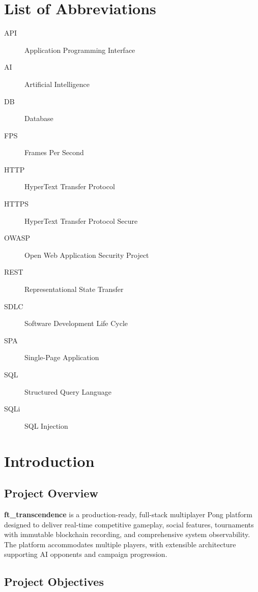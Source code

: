 \documentclass[11pt,a4paper]{report}
\begin{document}
\chapter*{List of Abbreviations}
\label{ch:abbr}
\begin{description}
  \item[API] Application Programming Interface
  \item[AI] Artificial Intelligence
  \item[DB] Database
  \item[FPS] Frames Per Second
  \item[HTTP] HyperText Transfer Protocol
  \item[HTTPS] HyperText Transfer Protocol Secure
  \item[OWASP] Open Web Application Security Project
  \item[REST] Representational State Transfer
  \item[SDLC] Software Development Life Cycle
  \item[SPA] Single-Page Application
  \item[SQL] Structured Query Language
  \item[SQLi] SQL Injection
\end{description}
\clearpage


\chapter{Introduction}
\label{ch:intro}

\section{Project Overview}
\label{sec:overview}

\textbf{ft\_transcendence} is a production-ready, full-stack multiplayer Pong platform designed to deliver real-time competitive gameplay, social features, tournaments with immutable blockchain recording, and comprehensive system observability. The platform accommodates multiple players, with extensible architecture supporting AI opponents and campaign progression.

\section{Project Objectives}
\label{sec:objectives}
\end{document}
